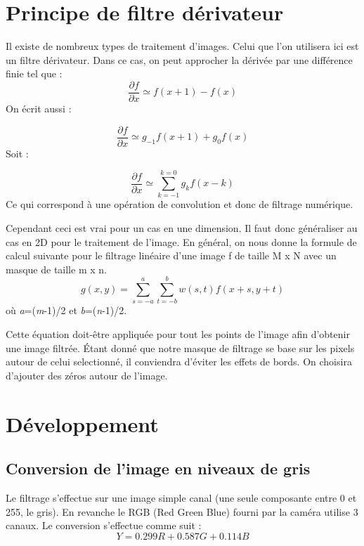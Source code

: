 
\chapter{Principe de filtre dérivateur}

Il existe de nombreux types de traitement d'images. Celui que l'on utilisera ici est un filtre dérivateur.
Dans ce cas, on peut approcher la dérivée par une différence finie tel que :
\begin{equation}
\frac{\partial f}{\partial x} \simeq f (x+1) - f(x)
\end{equation}
On écrit aussi :

\begin{equation}
\frac{\partial f}{\partial x} \simeq g_{-1} f(x+1) + g_0 f(x)
\end{equation}
Soit :

\begin{equation}
\frac{\partial f}{\partial x} \simeq \sum_{k=-1}^{k=0} g_k f(x-k)
\end{equation}
Ce qui correspond à une opération de convolution et donc de filtrage numérique.

\bigskip

Cependant ceci est vrai pour un cas en une dimension. Il faut donc généraliser au cas en 2D pour le traitement de l'image.
En général, on nous donne la formule de calcul suivante pour le filtrage linéaire d'une image f de taille M x N avec un masque de taille m x n.
\begin{equation}
g(x,y) = \sum_{s=-a}^a \sum_{t=-b}^b w(s,t)f(x+s,y+t)
\end{equation}
où \textit{a}=(\textit{m}-1)/2 et \textit{b}=(\textit{n}-1)/2.

\bigskip

Cette équation doit-être appliquée pour tout les points de l'image afin d'obtenir une image filtrée. Étant donné que notre masque de filtrage se base sur les pixels autour de celui \og{}selectionné\fg{}, il conviendra d'éviter les effets de bords. On choisira d'ajouter des zéros autour de l'image.

\chapter{Développement}

\section{Conversion de l'image en niveaux de gris}
Le filtrage s'effectue sur une image simple canal (une seule composante entre 0 et 255, le gris). En revanche le RGB (Red Green Blue) fourni par la caméra utilise 3 canaux. Le conversion s'effectue comme suit :
\begin{equation}
Y = 0.299R + 0.587G + 0.114B
\end{equation}

